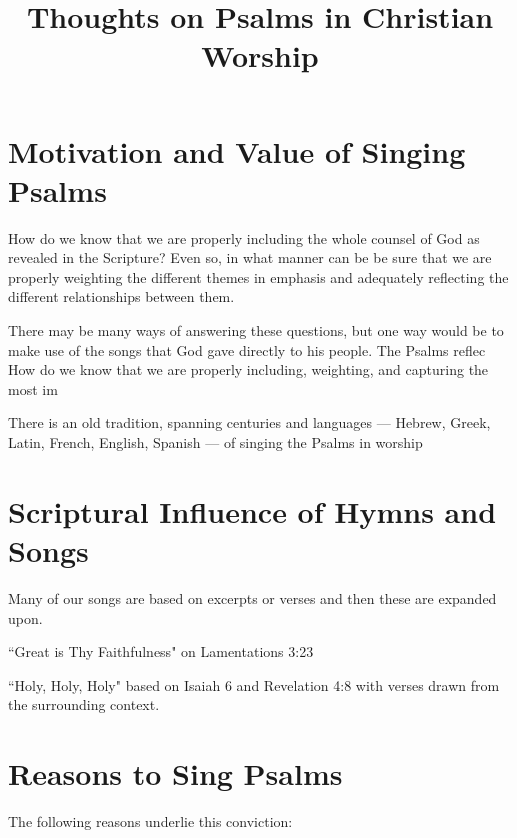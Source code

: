 \documentclass{article}
\title{Thoughts on Psalms in Christian Worship}
\begin{document}
\maketitle


\section{Motivation and Value of Singing Psalms}

How do we know that we are properly including the whole counsel of God as revealed in the Scripture? Even so, in what manner can be be sure that we are properly weighting the different themes in emphasis and adequately reflecting the different relationships between them.

There may be many ways of answering these questions, but one way would be to make use of the songs that God gave directly to his people.  The Psalms reflec 
How do we know that we are properly including, weighting, and capturing the most im

There is an old tradition, spanning centuries and languages --- Hebrew, Greek, Latin, French, English, Spanish --- of singing the Psalms in worship

\section{Scriptural Influence of Hymns and Songs}

Many of our songs are based on excerpts or verses and then these are expanded upon.

``Great is Thy Faithfulness" on Lamentations 3:23

``Holy, Holy, Holy" based on Isaiah 6 and Revelation 4:8 with verses drawn from the surrounding context. 

\section{Reasons to Sing Psalms}

The following reasons underlie this conviction:
\end{document}
